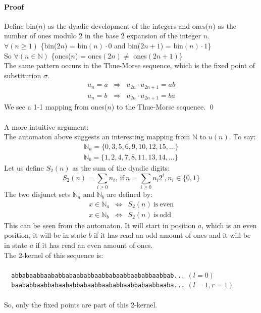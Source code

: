 \documentclass{article}
\begin{document}
\paragraph{Proof} Define bin($n$) as the dyadic development of the integers and
ones($n$) as the number of ones modulo 2 in the base 2 expansion of the integer
$n$.\\
$\forall (n \ge 1)$ \{bin($2n$) = bin$(n) \cdot 0$ and bin($2n + 1$) =
bin$(n) \cdot 1$\}\\
So $\forall (n \in \mathbb{N})$ \{ones($n$) = ones$(2n) \ne$ ones$(2n + 1)$\}\\
The same pattern occurs in the Thue-Morse sequence, which is the fixed point
of substitution $\sigma$.
\begin{eqnarray*}
u_n = a &\Rightarrow& u_{2n} \cdot u_{2n + 1} = ab\\
u_n = b &\Rightarrow& u_{2n} \cdot u_{2n + 1} = ba
\end{eqnarray*}
We see a 1-1 mapping from ones($n$) to the Thue-Morse sequence. \qed\\
\\
A more intuitive argument:\\
The automaton above suggests an interesting mapping from $\mathbb{N}$ to
$u(n)$. To say:
\begin{eqnarray*}
\mathbb{N}_a = \{0, 3, 5, 6, 9, 10, 12, 15, ...\}\\
\mathbb{N}_b = \{1, 2, 4, 7, 8, 11, 13, 14, ...\}
\end{eqnarray*}
Let us define $S_2(n)$ as the sum of the dyadic digits:
\begin{displaymath}
S_2(n) = \sum_{i \ge 0}n_i,\mathrm{\ if\ }
n = \sum_{i \ge 0}n_i2^i, n_i \in \{0, 1\}
\end{displaymath}
The two disjunct sets $\mathbb{N}_a$ and $\mathbb{N}_b$ are defined by:
\begin{eqnarray*}
x \in \mathbb{N}_a &\Leftrightarrow& S_2(n) \mathrm{\ is\ even}\\
x \in \mathbb{N}_b &\Leftrightarrow& S_2(n) \mathrm{\ is\ odd}
\end{eqnarray*}
This can be seen from the automaton. It will start in position $a$,
which is an even position, it will be in state $b$ if it has read an odd
amount of ones and it will be in state $a$ if it has read an even amount
of ones.\\
The 2-kernel of this sequence is:\\
\\
\verb#  abbabaabbaababbabaababbaabbabaabbaababbaabbab...# $(l = 0)$\\
\verb#  baababbaabbabaababbabaabbaababbaabbabaabbaaba...# $(l = 1, r = 1)$\\
\\
So, only the fixed points are part of this 2-kernel.
\end{document}
